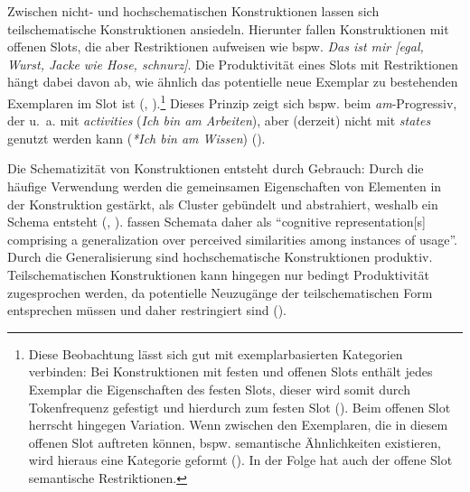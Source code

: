 Zwischen nicht- und hochschematischen Konstruktionen lassen sich teilschematische Konstruktionen ansiedeln. Hierunter fallen Konstruktionen mit offenen Slots, die aber Restriktionen aufweisen wie bspw. \textit{Das ist mir [egal, Wurst, Jacke wie Hose, schnurz]}. Die Produktivität eines Slots mit Restriktionen hängt dabei davon ab, wie ähnlich das potentielle neue Exemplar zu bestehenden Exemplaren im Slot ist (\cite[8]{BlumenthalDrame.2012}, \cite[17]{Diessel.2017}).\footnote{Diese Beobachtung lässt sich gut mit exemplarbasierten Kategorien verbinden: Bei Konstruktionen mit festen und offenen Slots enthält jedes Exemplar die Eigenschaften des festen Slots, dieser wird somit durch Tokenfrequenz gefestigt und hierdurch zum festen Slot (\cite[59]{Bybee.2013}). Beim offenen Slot herrscht hingegen Variation. Wenn zwischen den Exemplaren, die in diesem offenen Slot auftreten können, bspw. semantische Ähnlichkeiten existieren, wird hieraus eine Kategorie geformt (\cite[718]{Bybee.2006b}). In der Folge hat auch der offene Slot semantische Restriktionen.} Dieses Prinzip zeigt sich bspw. beim \textit{am}-Progressiv, der u.~a. mit \textit{activities} (\textit{Ich bin am Arbeiten}), aber (derzeit) nicht mit \textit{states} genutzt werden kann (\textit{*Ich bin am Wissen}) (\cite[181--184]{Flick.2016}).



Die Schematizität von Konstruktionen entsteht durch Gebrauch: Durch die häufige Verwendung werden die gemeinsamen Eigenschaften von Elementen in der Konstruktion gestärkt, als Cluster gebündelt und abstrahiert, weshalb ein Schema entsteht (\cite[xxiii]{Kemmer.2000}, \cite[218--220]{Langacker.2014}). \textcite[xxiii]{Kemmer.2000} fassen Schemata daher als "`cognitive representation[s] comprising a generalization over perceived similarities among instances of usage"'. Durch die Generalisierung sind hochschematische Konstruktionen produktiv. Teilschematischen Konstruktionen kann hingegen nur bedingt Produktivität zugesprochen werden, da potentielle Neuzugänge der teilschematischen Form entsprechen müssen und daher restringiert sind (\cite[67--69]{Bybee.2010}). 



